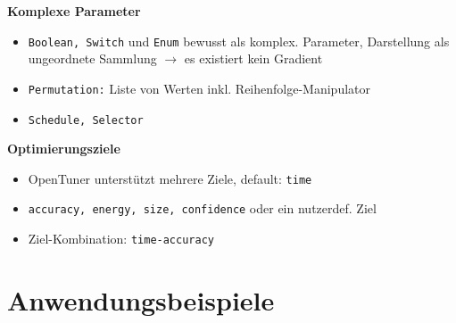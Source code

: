   \begingroup
  \begin{frame}
    \textbf{Komplexe Parameter}
    \begin{itemize}

      \item \texttt{Boolean, Switch} und \texttt{Enum} bewusst als komplex. Parameter, Darstellung
      als ungeordnete Sammlung $\rightarrow$ es existiert kein Gradient
      
      \item \texttt{Permutation:} Liste von Werten inkl. Reihenfolge-Manipulator
      \item \texttt{Schedule, Selector} \newline
      
    \end{itemize}
  
  \textbf{Optimierungsziele}
    \begin{itemize}
      \item OpenTuner unterstützt mehrere Ziele, default: \texttt{time}
      \item \texttt{accuracy, energy, size, confidence} oder ein nutzerdef. Ziel
      \item Ziel-Kombination: \texttt{time-accuracy}
    \end{itemize}
  \end{frame}
  \endgroup
    
    \section{Anwendungsbeispiele}
    
